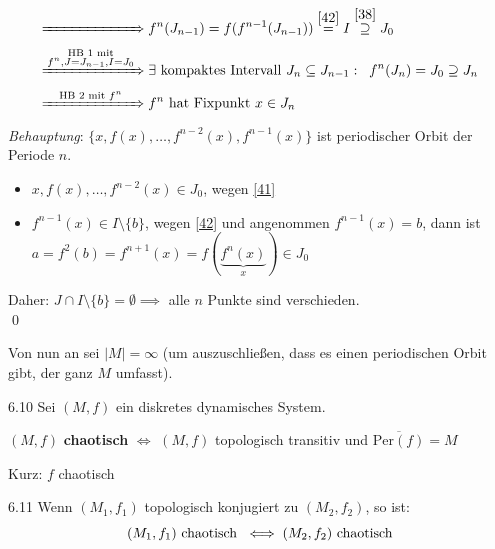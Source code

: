 \documentclass[a4paper]{article}
\begin{document}
\begin{Beweis}
\begin{align*}
\xRightarrow[\hspace{2.3cm}]{} &\; f^n(J_{n-1})=f(f^{n-1}(J_{n-1}))\overset{\eqref{42}}{=}I\overset{\eqref{38}}{\supseteq}J_0\\
\xRightarrow[\hspace{2.3cm}]{\substack{\text{HB 1 mit}\\ f^n, J=J_{n-1}, I=J_0}}&\; \exists \text{ kompaktes Intervall } J_n\subseteq J_{n-1}:\;\;f^n(J_n)=J_0\supseteq J_n\\
\xRightarrow[\hspace{2.3cm}]{\text{HB 2 mit }f^n}&\; f^n\text{ hat Fixpunkt }x\in J_n
\end{align*}
\textit{Behauptung}: $\{x,f(x),\ldots,f^{n-2}(x),f^{n-1}(x)\}$ ist periodischer Orbit der Periode $n$.\\
\begin{itemize}
\item $x, f(x),\ldots, f^{n-2}(x)\in J_0$, wegen \eqref{41}
\item $f^{n-1}(x)\in I\setminus \{b\}$, wegen \eqref{42} und angenommen $f^{n-1}(x)=b$, dann ist $a=f^2(b)=f^{n+1}(x)=f(\underbrace{f^n(x)}_{x})\in  J_0$ \lightning{}
\end{itemize}
Daher: $J\cap I\setminus\{b\}=\emptyset\implies$ alle $n$ Punkte sind verschieden.\\\qed
\end{Beweis}

Von nun an sei $|M|=\infty$ (um auszuschließen, dass es einen periodischen Orbit gibt, der ganz $M$ umfasst).

\begin{Def}{}{6.10}
Sei $(M,f)$ ein diskretes dynamisches System. 
\begin{center}$(M,f)$ \textbf{chaotisch} $\iff$ $(M,f)$ topologisch transitiv und $\overline{\mathrm{Per}(f)}=M$\end{center}
Kurz: \glqq $f$ chaotisch\grqq
\end{Def}

\begin{Bemerkung}{}{6.11}
Wenn $(M_1,f_1)$ topologisch konjugiert zu $(M_2,f_2)$, so ist:
\[(M_1,f_1)\text{ chaotisch }\iff (M_2,f_2)\text{ chaotisch}\]
\end{Bemerkung}
\end{document}
